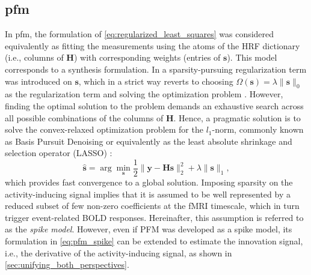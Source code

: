 
\subsection{\acrlong*{pfm}} In \acrfull*{pfm}, the formulation of
\cref{eq:regularized_least_squares} was considered equivalently as fitting the
measurements using the atoms of the HRF dictionary (i.e., columns of
$\mathbf{H}$) with corresponding weights (entries of $\mathbf{s}$). This model
corresponds to a synthesis formulation. In \cite{Gaudes2013Paradigmfreemapping}
a sparsity-pursuing regularization term was introduced on $\mathbf{s}$, which in
a strict way reverts to choosing \(\Omega(\mathbf{s})=\lambda \| \mathbf{s}
\|_0\) as the regularization term and solving the optimization problem
\citep{Bruckstein2009SparseSolutionsSystems}. However, finding the optimal
solution to the problem demands an exhaustive search across all possible
combinations of the columns of \(\mathbf{H}\). Hence, a  pragmatic solution is
to solve the convex-relaxed optimization problem for the \(l_1\)-norm, commonly
known as Basis Pursuit Denoising \citep{Chen2001Atomicdecompositionbasis} or
equivalently as the least absolute shrinkage and selection operator (LASSO)
\citep{Tibshirani1996RegressionShrinkageSelection}:
\begin{equation}
    \label{eq:pfm_spike}
    \hat{\mathbf{s}} = \arg \min_{\mathbf{s}} \frac{1}{2} \| \mathbf{y} - \mathbf{Hs} \|_2^2 + \lambda \| \mathbf{s} \|_1,
\end{equation}
which provides fast convergence to a global solution. Imposing sparsity on the
activity-inducing signal implies that it is assumed to be well represented by a
reduced subset of few non-zero coefficients at the fMRI timescale, which in turn
trigger event-related BOLD responses. Hereinafter, this assumption is referred
to as the \textit{spike model}. However, even if PFM was developed as a spike
model, its formulation in \cref{eq:pfm_spike} can be extended to estimate the
innovation signal, i.e., the derivative of the activity-inducing signal, as
shown in \cref{sec:unifying_both_perspectives}.


